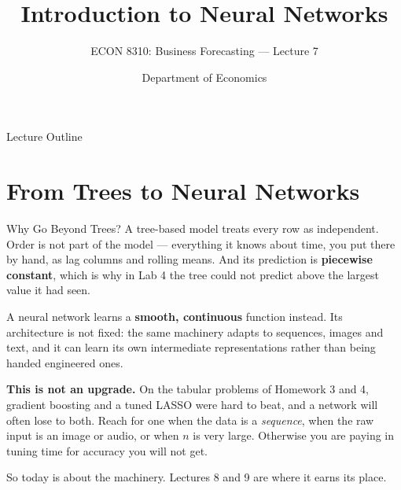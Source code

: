 \documentclass[aspectratio=169, 11pt]{beamer}
\title[Neural Networks]{Introduction to Neural Networks}
\subtitle{ECON 8310: Business Forecasting --- Lecture 7}
\author{Department of Economics}
\institute{University of Nebraska at Omaha}
\begin{document}

\begin{frame}
  \titlepage
\end{frame}

\begin{frame}{Lecture Outline}
  \tableofcontents
\end{frame}

\section{From Trees to Neural Networks}


\begin{frame}{Why Go Beyond Trees?}
  A tree-based model treats every row as independent. Order is not part of the model ---
  everything it knows about time, you put there by hand, as lag columns and rolling means.
  And its prediction is \textbf{piecewise constant}, which is why in Lab 4 the tree could not
  predict above the largest value it had seen.

  \vspace{0.15cm}
  A neural network learns a \textbf{smooth, continuous} function instead. Its architecture is
  not fixed: the same machinery adapts to sequences, images and text, and it can learn its own
  intermediate representations rather than being handed engineered ones.

  \begin{warningbox}
    \textbf{This is not an upgrade.} On the tabular problems of Homework 3 and 4, gradient
    boosting and a tuned LASSO were hard to beat, and a network will often lose to both. Reach
    for one when the data is a \emph{sequence}, when the raw input is an image or audio, or when
    $n$ is very large. Otherwise you are paying in tuning time for accuracy you will not get.
  \end{warningbox}

  \vspace{0.1cm}
  So today is about the machinery. Lectures 8 and 9 are where it earns its place.
\end{frame}
\end{document}
